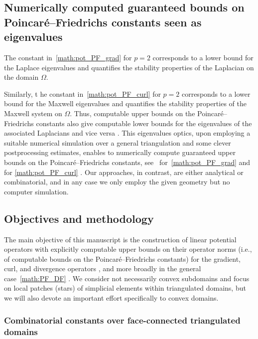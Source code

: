 \documentclass[10pt,letterpaper]{article}
\newcommand\cye[1]{%
  \protect\leavevmode
  \begingroup
    \color{red!35!yellow}%
    #1%
  \endgroup
}
\begin{document}
\subsection{\cye{Numerically computed guaranteed bounds on Poincar\'e--Friedrichs constants seen as eigenvalues}}

\cye{The constant in~\eqref{math:pot_PF_grad} for $p=2$ corresponds to a lower bound for the Laplace eigenvalues and quantifies the stability properties of the Laplacian on the domain $\Omega$.} 
\cye{Similarly, t}he constant \cye{in~\eqref{math:pot_PF_curl} for $p=2$} corresponds to a lower bound for the Maxwell eigenvalues and quantifies the stability properties of the Maxwell system on $\Omega$. 
Thus, computable upper bounds on the Poincar\'e--Friedrichs constants also give computable lower bounds for the eigenvalues of the associated Laplacians \cye{and vice versa}. 
\cye{This eigenvalues optics, upon employing a suitable numerical simulation} over a general triangulation \cye{and some clever postprocessing estimates, enables to numerically compute guaranteed upper bounds on the Poincar\'e--Friedrichs constants, see~\cite{Cars_Ged_LB_eigs_14,Liu_fram_eigs_15} for~\eqref{math:pot_PF_grad} and~\cite{gallistl2023computational} for \eqref{math:pot_PF_curl}}. \cye{Our approaches, in contrast, are either analytical or combinatorial, and in any case we only employ the given geometry but no computer simulation.}



\subsection{\cye{Objectives and methodology}}

The main objective of this manuscript is the construction of linear potential operators with explicitly computable upper bounds on their operator norms (i.e., of computable bounds on the Poincar\'e--Friedrichs constants) for the gradient, curl, and divergence operators\cye{, and more broadly in the general case~\eqref{math:PF_DF}}. 
\cye{We consider not necessarily} convex subdomains and focus on \cye{local patches (stars) of simplicial elements within triangulated domains, but we will also devote an important effort specifically to} convex domains. 

\subsubsection{\cye{Combinatorial constants over face-connected triangulated domains}}
\end{document}
